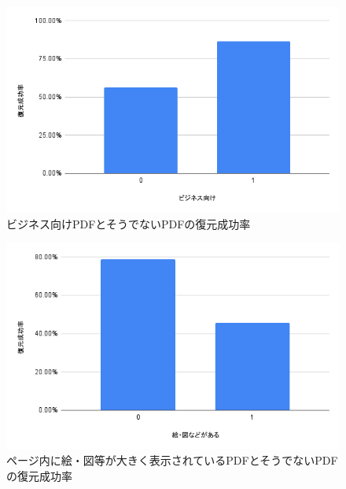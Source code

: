 \begin{figure}[htbp]
  \caption{ビジネス向けPDFとそうでないPDFの復元成功率}
  \label{fig:success-rate-business-or-not-pdf}
  \begin{center}
    \includegraphics[bb=0 0 600 371,width=15cm]{img/060_evaluation/consideration/pdf/success-rate-business-or-not-pdf.pdf}
  \end{center}
\end{figure}

\begin{figure}[htbp]
  \caption{ページ内に絵・図等が大きく表示されているPDFとそうでないPDFの復元成功率}
  \label{fig:success-rate-figure-or-not-pdf}
  \begin{center}
    \includegraphics[bb=0 0 600 371,width=15cm]{img/060_evaluation/consideration/pdf/success-rate-figure-or-not-pdf.pdf}
  \end{center}
\end{figure}

